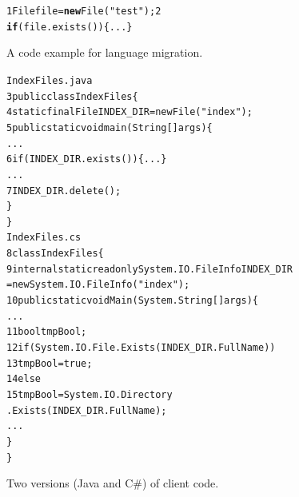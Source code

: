 \begin{figure}[t]
\begin{CodeOut}
\begin{alltt}
1  File file = \textbf{new} File("test"); 2
\textbf{if}(file.exists())\{...\}
\end{alltt}
\end{CodeOut}\vspace*{-4ex}
\caption{\label{fig:totranslation} A code example for language
migration.}%
\end{figure}
\begin{figure}[t]
\begin{CodeOut}\vspace*{-2ex}
\begin{alltt}
                  IndexFiles.java
3 public class IndexFiles \{
4   static final File INDEX_DIR = new File("index");
5   public static void main(String[] args) \{
      ...
6     if (INDEX_DIR.exists()) \{...\}
      ...
7       INDEX_DIR.delete();
    \}
  \}
                  IndexFiles.cs
8 class IndexFiles\{
9   internal static readonly System.IO.FileInfo INDEX_DIR
          = new System.IO.FileInfo("index");
10   public static void  Main(System.String[] args)\{
      ...
11     bool tmpBool;
12     if (System.IO.File.Exists(INDEX_DIR.FullName))
13       tmpBool = true;
14    else
15       tmpBool = System.IO.Directory
                         .Exists(INDEX_DIR.FullName);
      ...
    \}
 \}
\end{alltt}
\end{CodeOut}\vspace*{-4ex}
\caption{\label{fig:clientcode} Two versions (Java and C\#) of
client code.}\vspace*{-4ex}
\end{figure}



